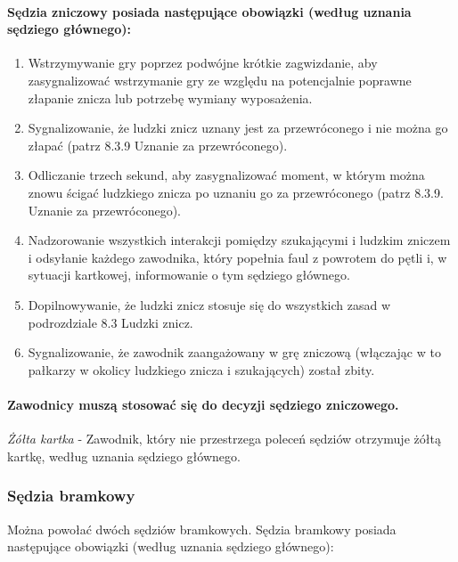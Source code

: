 \documentclass[12pt]{article}
\begin{document}
\paragraph{Sędzia zniczowy posiada następujące obowiązki (według
	uznania sędziego głównego):}

\begin{enumerate}
	\item Wstrzymywanie gry poprzez podwójne krótkie zagwizdanie, aby
	      zasygnalizować wstrzymanie gry ze względu na potencjalnie poprawne
	      złapanie znicza lub potrzebę wymiany wyposażenia.

	\item Sygnalizowanie, że ludzki znicz uznany jest za przewróconego i nie
	      można go złapać (patrz 8.3.9 Uznanie za przewróconego).

	\item Odliczanie trzech sekund, aby zasygnalizować moment, w którym można
	      znowu ścigać ludzkiego znicza po uznaniu go za przewróconego (patrz
	      8.3.9. Uznanie za przewróconego).

	\item Nadzorowanie wszystkich interakcji pomiędzy szukającymi i ludzkim
	      zniczem i odsyłanie każdego zawodnika, który popełnia faul z powrotem do
	      pętli i, w sytuacji kartkowej, informowanie o tym sędziego głównego.

	\item Dopilnowywanie, że ludzki znicz stosuje się do wszystkich zasad w
	      podrozdziale 8.3 Ludzki znicz.

	\item Sygnalizowanie, że zawodnik zaangażowany w grę zniczową (włączając w
	      to pałkarzy w okolicy ludzkiego znicza i szukających) został zbity.
\end{enumerate}

\paragraph{Zawodnicy muszą stosować się do decyzji sędziego
	zniczowego.}

\emph{Żółta kartka} - Zawodnik, który nie przestrzega poleceń sędziów
otrzymuje żółtą kartkę, według uznania sędziego głównego.

\subsubsection{Sędzia bramkowy}

Można powołać dwóch sędziów bramkowych. Sędzia bramkowy posiada
następujące obowiązki (według uznania sędziego głównego):
\end{document}
